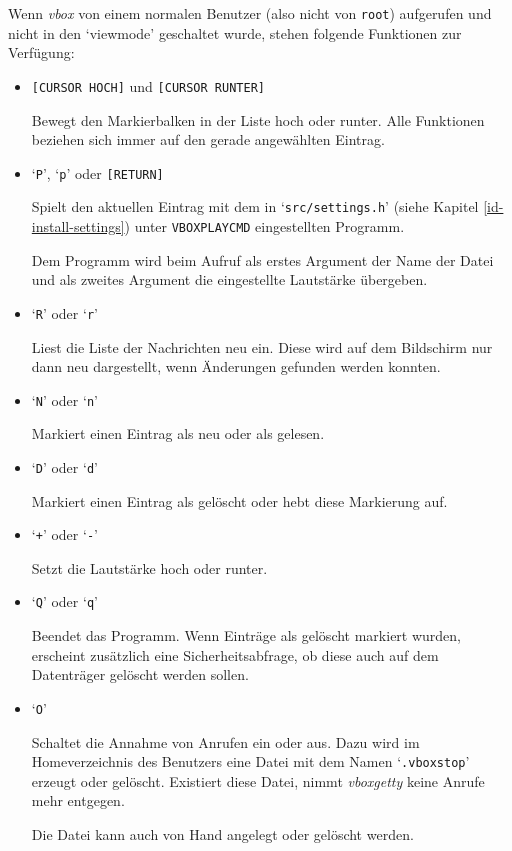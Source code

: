 Wenn {\em vbox\/} von einem normalen Benutzer (also nicht von
{\tt root}) aufgerufen und nicht in den `viewmode' geschaltet wurde,
stehen folgende Funktionen zur Verf\"{u}gung:

\begin{itemize}
\item {\tt [CURSOR HOCH]} und {\tt [CURSOR RUNTER]}


Bewegt den Markierbalken in der Liste hoch oder runter. Alle Funktionen
beziehen sich immer auf den gerade angew\"{a}hlten Eintrag.



\item `{\tt P}', `{\tt p}' oder {\tt [RETURN]}


Spielt den aktuellen Eintrag mit dem in `{\tt src/settings.h}' (siehe
Kapitel \ref{id-install-settings}) unter {\tt VBOXPLAYCMD} eingestellten Programm.

Dem Programm wird beim Aufruf als erstes Argument der Name der Datei und
als zweites Argument die eingestellte Lautst\"{a}rke \"{u}bergeben.



\item `{\tt R}' oder `{\tt r}'


Liest die Liste der Nachrichten neu ein. Diese wird auf dem Bildschirm nur
dann neu dargestellt, wenn \"{A}nderungen gefunden werden konnten.



\item `{\tt N}' oder `{\tt n}'


Markiert einen Eintrag als neu oder als gelesen.



\item `{\tt D}' oder `{\tt d}'


Markiert einen Eintrag als gel\"{o}scht oder hebt diese Markierung auf.



\item `{\tt +}' oder `{\tt -}'


Setzt die Lautst\"{a}rke hoch oder runter.



\item `{\tt Q}' oder `{\tt q}'


Beendet das Programm. Wenn Eintr\"{a}ge als gel\"{o}scht markiert wurden, erscheint
zus\"{a}tzlich eine Sicherheitsabfrage, ob diese auch auf dem Datentr\"{a}ger
gel\"{o}scht werden sollen.



\item `{\tt O}'


Schaltet die Annahme von Anrufen ein oder aus. Dazu wird im
Homeverzeichnis des Benutzers eine Datei mit dem Namen
`{\tt .vboxstop}' erzeugt oder gel\"{o}scht. Existiert diese Datei, nimmt
{\em vboxgetty\/} keine Anrufe mehr entgegen.

Die Datei kann auch von Hand angelegt oder gel\"{o}scht werden.



\end{itemize}


